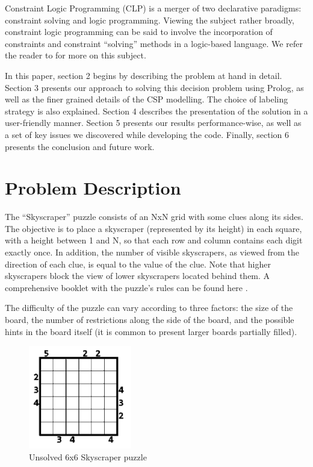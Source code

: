 \documentclass{llncs}
\begin{document}
Constraint Logic Programming (CLP) is a merger of two declarative paradigms: constraint solving and logic programming. Viewing the subject rather broadly, constraint logic programming can be said to involve the incorporation of constraints and constraint “solving” methods in a logic-based language. We refer the reader to \cite{jaffar_maher_1994} for more on this subject.

In this paper, section 2 begins by describing the problem at hand in detail. Section 3 presents our approach to solving this decision problem using Prolog, as well as the finer grained details of the CSP modelling. The choice of labeling strategy is also explained. Section 4 describes the presentation of the solution in a user-friendly manner. Section 5 presents our results performance-wise, as well as a set of key issues we discovered while developing the code. Finally, section 6 presents the conclusion and future work.

%
\section{Problem Description}
%
The ``Skyscraper'' puzzle consists of an NxN grid with some clues along its sides. The objective is to place a skyscraper (represented by its height) in each square, with a height between 1 and N, so that each row and column contains each digit exactly once. In addition, the number of visible skyscrapers, as viewed from the direction of each clue, is equal to the value of the clue. Note that higher skyscrapers block the view of lower skyscrapers located behind them. A comprehensive booklet with the puzzle's rules can be found here \cite{skyscrapers_booklet}.

The difficulty of the puzzle can vary according to three factors: the size of the board, the number of restrictions along the side of the board, and the possible hints in the board itself (it is common to present larger boards partially filled).

\begin{figure}[h!]
\begin{center}
\includegraphics[height=4.5cm,width=4.5cm]{images/skyscraper_unsolved.png}
\caption{Unsolved 6x6 Skyscraper puzzle}
\label{Figure 1}
\end{center}
\end{figure}
\end{document}
